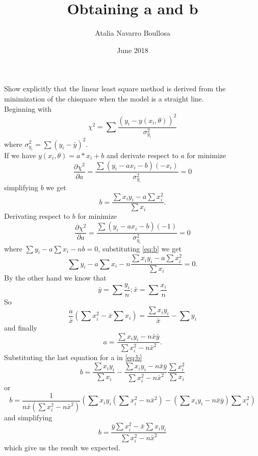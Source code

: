 \documentclass{article}
\title{Obtaining a and b}
\author{Atalia Navarro Boullosa }
\date{June 2018}
\begin{document}
Show explicitly that the linear least square method is derived from the minimization of the chisquare when the model is a straight line.
\ \\
Beginning with 
\begin{equation}
 \chi^{2}=\sum \frac{(y_{i}-y(x_{i},\theta))^{2}}{\sigma_{y_{i}}^{2}}
\end{equation}
where $\sigma_{y_{i}}^{2}= \sum(y_{i}-\bar{y})^{2}$. \\
If we have $y(x_{i},\theta)=a*x_{i}+b$ and derivate respect to $a$ for minimize 
\begin{equation}
 \frac{\partial \chi^{2}}{\partial a}=\frac{\sum(y_{i}-ax_{i}-b)(-x_{i})}{\sigma_{y_{i}}^{2}}=0
\end{equation}
simplifying $b$ we get
\begin{equation}
b= \frac{\sum x_{i}y_{i}-a\sum x_{i}^{2}}{\sum x_{i}} .
\label{eq:b}
\end{equation}
Derivating respect to $b$ for minimize
\begin{equation}
\frac{\partial \chi^{2}}{\partial a}=\frac{\sum(y_{i}-ax_{i}-b)(-1)}{\sigma_{y_{i}}^{2}}=0
\end{equation}
where $\sum y_{i}-a\sum x_{i} -nb=0$, substituting \ref{eq:b} we get 
\begin{equation}
\sum y_{i}-a\sum x_{i}-n\frac{\sum x_{i}y_{i}-a\sum x_{i}^{2}}{\sum x_{i}}=0 .
\end{equation}
By the other hand we know that 
\begin{equation}
\bar{y}=\sum \frac{y_{i}}{n} ;
\bar{x}=\sum \frac{x_{i}}{n}
\end{equation}
So
\begin{equation}
\frac{a}{\bar{x}}(\sum x_{i}^{2}-\bar{x}\sum x_{i})=\frac{\sum x_{i}y_{i}}{\bar{x}}-\sum y_{i}
\end{equation}
and finally
\begin{equation}
a=\frac{\sum x_{i}y_{i}-n\bar{x}\bar{y}}{\sum x_{i}^{2}-n\bar{x}^{2}}.
\end{equation}
Substituting the last equation for a in \ref{eq:b}
\begin{equation}
b=\frac{\sum x_{i}y_{i}}{\sum x_{i}}-\frac{\sum x_{i}y_{i}-n\bar{x}\bar{y}}{\sum x_{i}^{2}-n\bar{x}^{2}}\frac{\sum x_{i}^{2}}{\sum x_{i}}
\end{equation}
or 
\begin{equation}
b=\frac{1}{n\bar{x}(\sum x_{i}^{2}-n\bar{x}^{2})}(\sum x_{i}y_{i}(\sum x_{i}^{2}-n\bar{x}^{2})-(\sum x_{i}y_{i}-n\bar{x}\bar{y})\sum x_{i}^{2})
\end{equation}
and simplifying 
\begin{equation}
b=\frac{\bar{y}\sum x_{i}^{2}-\bar{x}\sum x_{i}y_{i}}{\sum x_{i}^{2}-n\bar{x}^{2}}
\end{equation}
which give us the result we expected. 
\end{document}
